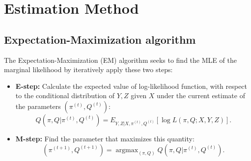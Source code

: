 \documentclass[11pt, oneside]{article}   	%
\DeclareMathOperator*{\argmax}{argmax}
\begin{document}
\section{Estimation Method}
\subsection{Expectation-Maximization algorithm}

The Expectation-Maximization (EM) algorithm seeks to find the MLE of the marginal likelihood by iteratively apply these two steps:
\begin{itemize}
\item \textbf{E-step:} Calculate the expected value of log-likelihood function, with respect to the conditional distribution of $Y, Z$ given $X$ under the current estimate of the parameters $(\pi^{(t)}, Q^ {(t)})$:
\begin{equation*}
Q(\pi,Q|\pi^{(t)}, Q^ {(t)})=E_{Y,Z|X,\pi^{(t)}, Q^ {(t)}}[\log L(\pi,Q;X,Y,Z)].
\end{equation*}
\item \textbf{M-step:} Find the parameter that maximizes this quantity:
\begin{equation*}
(\pi^{(t+1)}, Q^ {(t+1)}) =\argmax_{(\pi,Q)} Q(\pi,Q|\pi^{(t)}, Q^ {(t)}).
\end{equation*}
\end{itemize}
\end{document}
